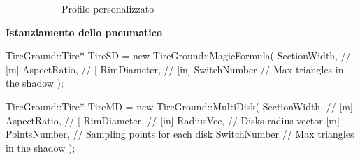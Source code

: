 \documentclass[xcolor=dvipsnames]{beamer} %
\begin{document}
\begin{frame}
\begin{figure}[h!]
\begin{subfigure}{.3\textwidth}
			\small{Profilo personalizzato}
		\end{subfigure}
		\hfill
	\end{figure}
\end{frame}

\begin{frame}[fragile]
	\Large{\textbf{Istanziamento dello pneumatico}}
	\normalsize
\begin{pseudoc}
TireGround::Tire* TireSD = new TireGround::MagicFormula(
SectionWidth, // [m]
AspectRatio,  // [%
RimDiameter,  // [in]
SwitchNumber  // Max triangles in the shadow
);
\end{pseudoc}
\begin{pseudoc}
TireGround::Tire* TireMD = new TireGround::MultiDisk(
SectionWidth, // [m]
AspectRatio,  // [%
RimDiameter,  // [in]
RadiusVec,    // Disks radius vector [m]
PointsNumber, // Sampling points for each disk
SwitchNumber  // Max triangles in the shadow
);
\end{pseudoc}
\end{frame}
\end{document}
